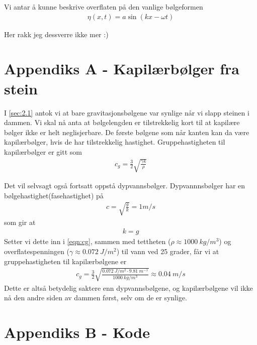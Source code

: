 \documentclass[12p,a4paper]{article}
\begin{document}
Vi antar å kunne beskrive overflaten på den vanlige bølgeformen
\begin{align*}
    \eta(x,t) = a\sin(kx - \omega t)
\end{align*}

Her rakk jeg dessverre ikke mer :)

\section{Appendiks A - Kapilærbølger fra stein}\label{sec:appendiks_A}
I \ref{sec:2.1} antok vi at bare gravitasjonsbølgene var synlige når vi slapp steinen i dammen. Vi skal nå anta at bølgelengden er tilstrekkelig kort til at kapilære bølger ikke er helt neglisjerbare. De første bølgene som når kanten kan da være kapilærbølger, hvis de har tilstrekkelig hastighet. Gruppehastigheten til kapilærbølger er gitt som
\begin{align}\label{eqn:cg}
    c_g = \frac{3}{2}\sqrt{\frac{\gamma k}{\rho}}
\end{align}

Det vil selvsagt også fortsatt oppstå dypvannsbølger. Dypvannnsbølger har en bølgehastighet(fasehastighet) på
\begin{align*}
    c = \sqrt{\frac{g}{k}} = 1\si{m/s}
\end{align*}
som gir at
\begin{align*}
    k = g
\end{align*}
Setter vi dette inn i \ref{eqn:cg}, sammen med tettheten ($\rho \approx \SI{1000}{kg/m^3}$) og overflatespenningen ($\gamma \approx \SI{0.072}{J/m^2}$) til vann ved 25 grader, får vi at gruppehastigheten til kapilærbølgene er
\begin{align*}
    c_g = \frac{3}{2}\sqrt{\frac{\SI{0.072}{J/m^2} \cdot \SI{9.81}{m^{-1}}}{\SI{1000}{kg/m^3}}} \approx \SI{0.04}{m/s}
\end{align*}
Dette er altså betydelig saktere enn dypvannsbølgene, og kapilærbølgene vil ikke nå den andre siden av dammen først, selv om de er synlige.


\section{Appendiks B - Kode}\label{sec:appendiks_B}

\end{document}
